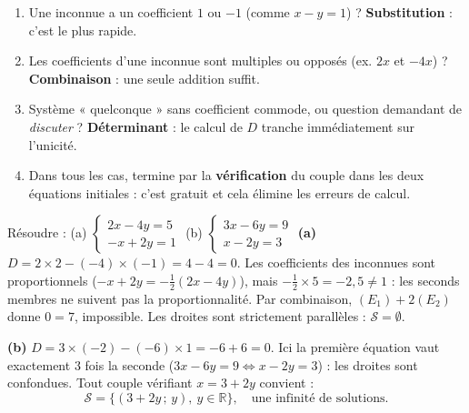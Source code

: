\documentclass[11pt]{article}
\begin{document}
\begin{methode}
\begin{enumerate}
\item Une inconnue a un coefficient $1$ ou $-1$ (comme $x - y = 1$) ? \textbf{Substitution} : c'est le plus rapide.
\item Les coefficients d'une inconnue sont multiples ou opposés (ex. $2x$ et $-4x$) ? \textbf{Combinaison} : une seule addition suffit.
\item Système « quelconque » sans coefficient commode, ou question demandant de \emph{discuter} ? \textbf{Déterminant} : le calcul de $D$ tranche immédiatement sur l'unicité.
\item Dans tous les cas, termine par la \textbf{vérification} du couple dans les deux équations initiales : c'est gratuit et cela élimine les erreurs de calcul.
\end{enumerate}
\end{methode}

\begin{exoresolu}
Résoudre : (a) $\begin{cases} 2x - 4y = 5 \\ -x + 2y = 1 \end{cases}$ \qquad (b) $\begin{cases} 3x - 6y = 9 \\ x - 2y = 3 \end{cases}$
\tcblower
\textbf{(a)} $D = 2\times 2 - (-4)\times(-1) = 4 - 4 = 0$. Les coefficients des inconnues sont proportionnels ($-x + 2y = -\tfrac{1}{2}(2x - 4y)$), mais $-\tfrac{1}{2}\times 5 = -2{,}5 \neq 1$ : les seconds membres ne suivent pas la proportionnalité. Par combinaison, $(E_1) + 2(E_2)$ donne $0 = 7$, impossible. Les droites sont strictement parallèles : $\mathcal{S} = \emptyset$.

\textbf{(b)} $D = 3\times(-2) - (-6)\times 1 = -6 + 6 = 0$. Ici la première équation vaut exactement $3$ fois la seconde ($3x - 6y = 9 \Leftrightarrow x - 2y = 3$) : les droites sont confondues. Tout couple vérifiant $x = 3 + 2y$ convient :
\[ \mathcal{S} = \{(3 + 2y\,;\,y),\ y \in \mathbb{R}\}, \quad \text{une infinité de solutions.} \]
\end{exoresolu}
\end{document}
